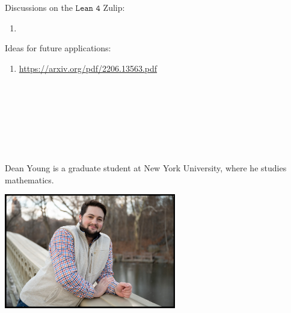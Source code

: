 \documentclass{book}
\theoremstyle{definition}
\newcounter{lcounter}
\begin{document}
{{Discussions on the $\texttt{Lean 4}$ Zulip:

\begin{enumerate}
\item 
\end{enumerate}

Ideas for future applications:

\begin{enumerate}
\item \url{https://arxiv.org/pdf/2206.13563.pdf}
\end{enumerate}

\newpage 
\ \\
\ \\
\ \\
\ \\
\ \\
\ \\
\begin{center}
\begin{tcolorbox}[width=5in,colback={white},title={\begin{center}\texttt{About the Author} \addtocounter{lcounter}{1}  \end{center}},colbacktitle=Yellow,coltitle=black]
Dean Young is a graduate student at New York University, where he studies mathematics. \\
\begin{center}
\includegraphics[width=7.5cm,height=5cm]{about.jpg}
\end{center}
\end{tcolorbox}
\end{center}

}}
\end{document}
